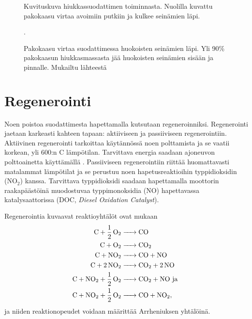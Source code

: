 \begin{figure}[H]
    \centering 
               {Kuvituskuva hiukkassuodattimen toiminnasta. Nuolilla kuvattu pakokaasu virtaa avoimiin putkiin ja kulkee seinämien läpi.}
    \caption{Pakokaasu virtaa suodattimessa huokoisten seinämien läpi. Yli 90\% pakokaasun hiukkasmassasta jää huokoisten seinämien sisään ja pinnalle. Mukailtu lähteestä \cite{dieselnet_dpf}}.
    \label{fig:wall-flow-dpf}
\end{figure}



\section{Regenerointi}
Noen poistoa suodattimesta hapettamalla kutsutaan regeneroinniksi. Regenerointi jaetaan karkeasti kahteen tapaan: aktiiviseen ja passiiviseen regenerointiin. 
Aktiivinen regenerointi tarkoittaa käytännössä noen polttamista ja se
vaatii korkean, yli 600:n \degree C lämpötilan. Tarvittava energia saadaan ajoneuvon polttoainetta käyttämällä \cite{dieselnet_dpf}. Passiiviseen regenerointiin riittää huomattavasti matalammat lämpötilat ja se perustuu noen hapetusreaktioihin typpidioksidin (NO\(_2\)) kanssa. Tarvittava typpidioksidi saadaan hapettamalla moottorin raakapäästöinä muodostuvaa typpimonoksidia (NO) hapettavassa katalysaattorissa (DOC, \emph{Diesel Oxidation Catalyst}).


Regenerointia kuvaavat reaktioyhtälöt ovat \cite{LiuGuanlin2021Roio} mukaan  
\begin{align*}
    \ce{C + 1/2 O2 &-> CO }\\
    \ce{C + O2 &-> CO2}\\
    \ce{C + NO2 &-> CO +  NO}  \\
    \ce{C + 2 NO2 &-> CO2 + 2 NO}  \\
    \ce{C + NO2 + 1/2 O2 &-> CO2 + NO} \text{ ja }\\
    \ce{C + NO2 + 1/2 O2 &-> CO + NO2},
\end{align*}
ja niiden reaktionopeudet voidaan määrittää Arrheniuksen yhtälöinä.

